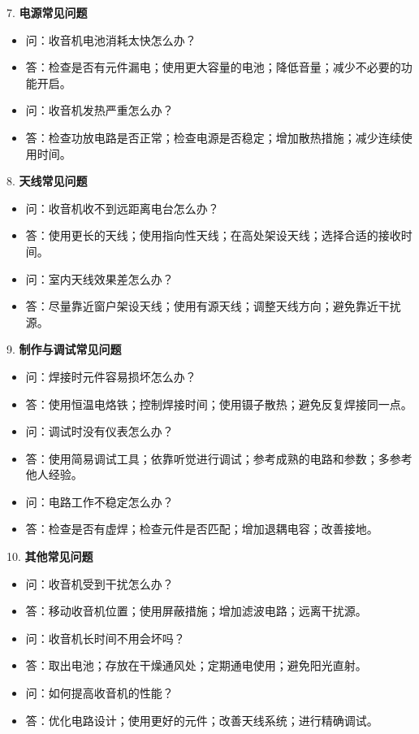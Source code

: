 \documentclass[12pt,UTF8]{ctexbook}
\begin{document}
7. \textbf{电源常见问题}
   \begin{itemize}[leftmargin=3.5em]
   \item 问：收音机电池消耗太快怎么办？
   \item 答：检查是否有元件漏电；使用更大容量的电池；降低音量；减少不必要的功能开启。
   \item 问：收音机发热严重怎么办？
   \item 答：检查功放电路是否正常；检查电源是否稳定；增加散热措施；减少连续使用时间。
   \end{itemize}

8. \textbf{天线常见问题}
   \begin{itemize}[leftmargin=3.5em]
   \item 问：收音机收不到远距离电台怎么办？
   \item 答：使用更长的天线；使用指向性天线；在高处架设天线；选择合适的接收时间。
   \item 问：室内天线效果差怎么办？
   \item 答：尽量靠近窗户架设天线；使用有源天线；调整天线方向；避免靠近干扰源。
   \end{itemize}

9. \textbf{制作与调试常见问题}
   \begin{itemize}[leftmargin=3.5em]
   \item 问：焊接时元件容易损坏怎么办？
   \item 答：使用恒温电烙铁；控制焊接时间；使用镊子散热；避免反复焊接同一点。
   \item 问：调试时没有仪表怎么办？
   \item 答：使用简易调试工具；依靠听觉进行调试；参考成熟的电路和参数；多参考他人经验。
   \item 问：电路工作不稳定怎么办？
   \item 答：检查是否有虚焊；检查元件是否匹配；增加退耦电容；改善接地。
   \end{itemize}

10. \textbf{其他常见问题}
    \begin{itemize}[leftmargin=3.5em]
    \item 问：收音机受到干扰怎么办？
    \item 答：移动收音机位置；使用屏蔽措施；增加滤波电路；远离干扰源。
    \item 问：收音机长时间不用会坏吗？
    \item 答：取出电池；存放在干燥通风处；定期通电使用；避免阳光直射。
    \item 问：如何提高收音机的性能？
    \item 答：优化电路设计；使用更好的元件；改善天线系统；进行精确调试。
    \end{itemize}
\end{document}
